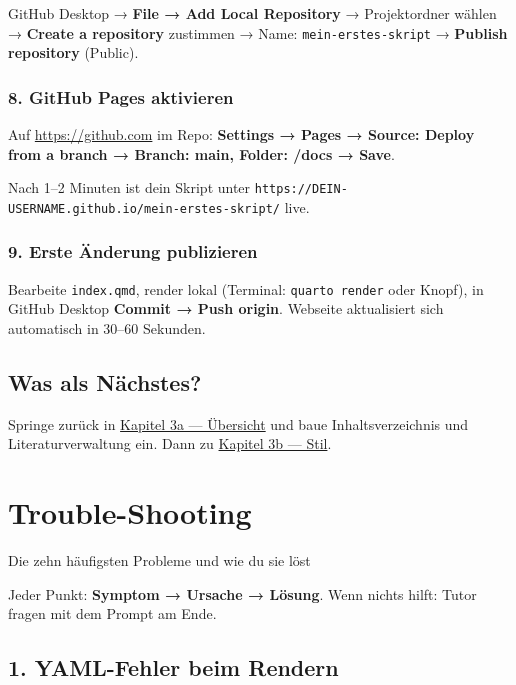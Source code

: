 \documentclass[
  ngerman,
  a4paper,
  DIV=11]{scrreprt}
\begin{document}
GitHub Desktop → \textbf{File → Add Local Repository} → Projektordner
wählen → \textbf{Create a repository} zustimmen → Name:
\texttt{mein-erstes-skript} → \textbf{Publish repository} (Public).

\subsection{8. GitHub Pages aktivieren}\label{github-pages-aktivieren}

Auf \url{https://github.com} im Repo: \textbf{Settings → Pages → Source:
Deploy from a branch → Branch: main, Folder: /docs → Save}.

Nach 1--2 Minuten ist dein Skript unter
\texttt{https://DEIN-USERNAME.github.io/mein-erstes-skript/} live.

\subsection{9. Erste Änderung
publizieren}\label{erste-uxe4nderung-publizieren}

Bearbeite \texttt{index.qmd}, render lokal (Terminal:
\texttt{quarto\ render} oder Knopf), in GitHub Desktop \textbf{Commit →
Push origin}. Webseite aktualisiert sich automatisch in 30--60 Sekunden.

\section{Was als Nächstes?}\label{was-als-nuxe4chstes}

Springe zurück in \hyperref[a-inhaltsverzeichnis-und-literatur]{Kapitel
3a --- Übersicht} und baue Inhaltsverzeichnis und Literaturverwaltung
ein. Dann zu \hyperref[b-th-kuxf6ln-stil-einbauen]{Kapitel 3b --- Stil}.

\chapter{Trouble-Shooting}\label{trouble-shooting}

Die zehn häufigsten Probleme und wie du sie löst

\hfill\break

Jeder Punkt: \textbf{Symptom → Ursache → Lösung}. Wenn nichts hilft:
Tutor fragen mit dem Prompt am Ende.

\section{1. YAML-Fehler beim Rendern}\label{yaml-fehler-beim-rendern}
\end{document}
